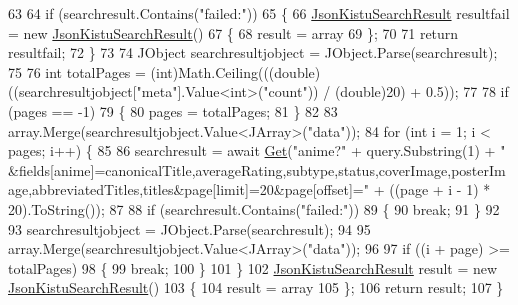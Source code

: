 \begin{DoxyCode}
63 
64             \textcolor{keywordflow}{if} (searchresult.Contains(\textcolor{stringliteral}{"failed:"}))
65             \{
66                 \mbox{\hyperlink{class_little_weeb_library_1_1_models_1_1_json_kistu_search_result}{JsonKistuSearchResult}} resultfail = \textcolor{keyword}{new} 
      \mbox{\hyperlink{class_little_weeb_library_1_1_models_1_1_json_kistu_search_result}{JsonKistuSearchResult}}()
67                 \{
68                     result = array
69                 \};
70 
71                 \textcolor{keywordflow}{return} resultfail;
72             \}
73 
74             JObject searchresultjobject = JObject.Parse(searchresult);
75 
76             \textcolor{keywordtype}{int} totalPages = (int)Math.Ceiling(((\textcolor{keywordtype}{double})((searchresultjobject[\textcolor{stringliteral}{"meta"}].Value<\textcolor{keywordtype}{int}>(\textcolor{stringliteral}{"count"})) 
      / (\textcolor{keywordtype}{double})20) + 0.5));
77 
78             \textcolor{keywordflow}{if} (pages == -1)
79             \{
80                 pages = totalPages;
81             \}
82 
83             array.Merge(searchresultjobject.Value<JArray>(\textcolor{stringliteral}{"data"}));
84             \textcolor{keywordflow}{for} (\textcolor{keywordtype}{int} i = 1; i < pages; i++) \{
85 
86                 searchresult = await \mbox{\hyperlink{class_little_weeb_library_1_1_handlers_1_1_kitsu_handler_a8b7c629a03096c3152252f6b5cf2937f}{Get}}(\textcolor{stringliteral}{"anime?"} + query.Substring(1) + \textcolor{stringliteral}{"
      &fields[anime]=canonicalTitle,averageRating,subtype,status,coverImage,posterImage,abbreviatedTitles,titles&page[limit]=20&page[offset]="} +
       ((page + i - 1) * 20).ToString());
87 
88                 \textcolor{keywordflow}{if} (searchresult.Contains(\textcolor{stringliteral}{"failed:"}))
89                 \{
90                     \textcolor{keywordflow}{break};
91                 \}
92 
93                 searchresultjobject = JObject.Parse(searchresult);
94 
95                 array.Merge(searchresultjobject.Value<JArray>(\textcolor{stringliteral}{"data"}));
96 
97                 \textcolor{keywordflow}{if} ((i + page) >= totalPages)
98                 \{
99                     \textcolor{keywordflow}{break};
100                 \}
101             \}
102             \mbox{\hyperlink{class_little_weeb_library_1_1_models_1_1_json_kistu_search_result}{JsonKistuSearchResult}} result = \textcolor{keyword}{new} 
      \mbox{\hyperlink{class_little_weeb_library_1_1_models_1_1_json_kistu_search_result}{JsonKistuSearchResult}}()
103             \{
104                 result = array
105             \};
106             \textcolor{keywordflow}{return} result;
107         \}
\end{DoxyCode}
